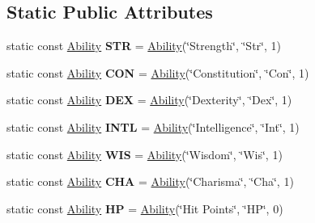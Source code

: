 \subsection*{Static Public Attributes}
\begin{DoxyCompactItemize}
\item 
\hypertarget{class_ability_ac9a5cb01ac885b5bf774a4d7807328d2}{}\label{class_ability_ac9a5cb01ac885b5bf774a4d7807328d2} 
static const \hyperlink{class_ability}{Ability} {\bfseries S\+TR} = \hyperlink{class_ability}{Ability}(\char`\"{}Strength\char`\"{}, \char`\"{}Str\char`\"{}, 1)
\item 
\hypertarget{class_ability_a65c8665564bbb52e0cd6da986fb8f757}{}\label{class_ability_a65c8665564bbb52e0cd6da986fb8f757} 
static const \hyperlink{class_ability}{Ability} {\bfseries C\+ON} = \hyperlink{class_ability}{Ability}(\char`\"{}Constitution\char`\"{}, \char`\"{}Con\char`\"{}, 1)
\item 
\hypertarget{class_ability_a2a967c5d959c093e95ee68f0cf3bab87}{}\label{class_ability_a2a967c5d959c093e95ee68f0cf3bab87} 
static const \hyperlink{class_ability}{Ability} {\bfseries D\+EX} = \hyperlink{class_ability}{Ability}(\char`\"{}Dexterity\char`\"{}, \char`\"{}Dex\char`\"{}, 1)
\item 
\hypertarget{class_ability_a0b5b5f495d2b2d5761fd8d39900580c4}{}\label{class_ability_a0b5b5f495d2b2d5761fd8d39900580c4} 
static const \hyperlink{class_ability}{Ability} {\bfseries I\+N\+TL} = \hyperlink{class_ability}{Ability}(\char`\"{}Intelligence\char`\"{}, \char`\"{}Int\char`\"{}, 1)
\item 
\hypertarget{class_ability_a6c5466c5c88bfd854ef45e9e1791d9c5}{}\label{class_ability_a6c5466c5c88bfd854ef45e9e1791d9c5} 
static const \hyperlink{class_ability}{Ability} {\bfseries W\+IS} = \hyperlink{class_ability}{Ability}(\char`\"{}Wisdom\char`\"{}, \char`\"{}Wis\char`\"{}, 1)
\item 
\hypertarget{class_ability_afcb246f2f32bbd699125fd2292936c65}{}\label{class_ability_afcb246f2f32bbd699125fd2292936c65} 
static const \hyperlink{class_ability}{Ability} {\bfseries C\+HA} = \hyperlink{class_ability}{Ability}(\char`\"{}Charisma\char`\"{}, \char`\"{}Cha\char`\"{}, 1)
\item 
\hypertarget{class_ability_aba948b82664e534890f107cd40da3fcc}{}\label{class_ability_aba948b82664e534890f107cd40da3fcc} 
static const \hyperlink{class_ability}{Ability} {\bfseries HP} = \hyperlink{class_ability}{Ability}(\char`\"{}Hit Points\char`\"{}, \char`\"{}HP\char`\"{}, 0)
\item 

\end{DoxyCompactItemize}

